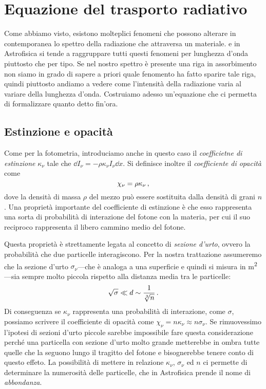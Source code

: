 \section{Equazione del trasporto radiativo}
    Come abbiamo visto, esistono molteplici fenomeni che possono alterare in contemporanea lo spettro della radiazione che attraversa un materiale. e in Astrofisica si tende a raggruppare tutti questi fenomeni per lunghezza d'onda piuttosto che per tipo. Se nel nostro spettro è presente una riga in assorbimento non siamo in grado di sapere a priori quale fenomento ha fatto sparire tale riga, quindi piuttosto andiamo a vedere come l'intensità della radiazione varia al variare della lunghezza d'onda. Costruiamo adesso un'equazione che ci permetta di formalizzare quanto detto fin'ora.
    \subsection{Estinzione e opacità}
        Come per la fotometria, introduciamo anche in questo caso il \emph{coefficietne di estinzione} $\kappa_\nu$ tale che $\dd{I_\nu} = -\rho\kappa_{\nu}I_{\nu}\dd{x}$. Si definisce inoltre il \emph{coefficiente di opacità} come
        \begin{equation}
            \chi_\nu = \rho\kappa_\nu
            \,,
        \end{equation}
        dove la densità di massa $\rho$ del mezzo può essere sostituita dalla densità di grani $n$. Una proprietà importante del coefficiente di estinzione è che esso rappresenta una sorta di probabilità di interazione del fotone con la materia, per cui il suo reciproco rappresenta il libero cammino medio del fotone.

        Questa proprietà è strettamente legata al concetto di \emph{sezione d'urto}, ovvero la probabilità che due particelle interagiscono. Per la nostra trattazione assumeremo che la sezione d'urto $\sigma_{\nu}$---che è analoga a una superficie e quindi si misura in \unit{m^2}---sia sempre molto piccola rispetto alla distanza media tra le particelle:
        \begin{equation*}
            \sqrt{\sigma} \ll d \sim \frac{1}{\sqrt[3]{n}}
            \,.
        \end{equation*}
        Di conseguenza se $\kappa_\nu$ rappresenta una probabilità di interazione, come $\sigma$, possiamo scrivere il coefficiente di opacità come $\chi_\nu = n\kappa_\nu \approx n\sigma_{\nu}$. Se rimuovessimo l'ipotesi di sezioni d'urto piccole sarebbe impossibile fare questa considerazione perché una particella con sezione d'urto molto grande metterebbe in ombra tutte quelle che la seguono lungo il tragitto del fotone e bisognerebbe tenere conto di questo effeto. La possibilità di mettere in relazione $\kappa_\nu$, $\sigma_\nu$ ed $n$ ci permette di determinare la numerosità delle particelle, che in Astrofisica prende il nome di \emph{abbondanza}.

